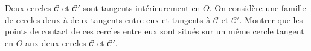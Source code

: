 \documentclass[a4paper,12pt,reqno]{amsart}
\begin{document}
\begin{exo}


  Deux cercles $\mathcal{C}$ et $\mathcal{C}'$ sont tangents intérieurement en $O$. On considère une famille de cercles deux à deux tangents entre eux et tangents à $\mathcal{C}$ et $\mathcal{C}'$. Montrer que les points de contact de ces cercles entre eux sont situés sur un même cercle tangent en $O$ aux deux cercles $\mathcal{C}$ et $\mathcal{C}'$.
\end{exo}
\end{document}
